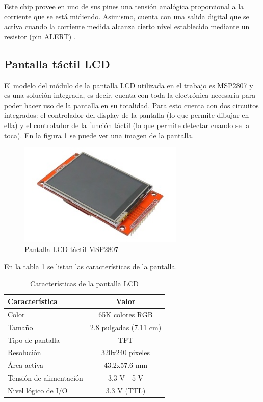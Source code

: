 Este chip provee en uno de sus pines una tensión analógica proporcional a la corriente que se está midiendo. Asimismo, cuenta con una salida digital que se activa cuando la corriente medida alcanza cierto nivel establecido mediante un resistor (pin ALERT) \citep{INA301}.

\subsection{Pantalla táctil LCD}

El modelo del módulo de la pantalla LCD utilizada en el trabajo es MSP2807 y es una solución integrada, es decir, cuenta con toda la electrónica necesaria para poder hacer uso de la pantalla en su totalidad. Para esto cuenta con dos circuitos integrados: el controlador del display de la pantalla (lo que permite dibujar en ella) y el controlador de la función táctil (lo que permite detectar cuando se la toca). En la figura \ref{fig:pantLCD} se puede ver una imagen de la pantalla.

\begin{figure}[H]
\centering
\includegraphics[width=0.7\textwidth]{./Figures/pant_LCD.png}
\caption{Pantalla LCD táctil MSP2807}
\label{fig:pantLCD}
\end{figure}

En la tabla \ref{tab:caractLCD} se listan las características de la pantalla.

\begin{table}[H]
	\centering
	\caption{Características de la pantalla LCD}
	\begin{tabular}{l c}
		\toprule
		\textbf{Característica}	& \textbf{Valor} \\
		\midrule
		Color				& 65K colores RGB \\
		Tamaño				& 2.8 pulgadas (7.11 cm) \\
		Tipo de pantalla	& TFT \\
		Resolución			& 320x240 pixeles \\
		Área activa			& 43.2x57.6 mm \\
		Tensión de alimentación		& 3.3 V - 5 V \\
		Nivel lógico de I/O			& 3.3 V (TTL) \\		
		\bottomrule
		\hline
	\end{tabular}
	\label{tab:caractLCD}
\end{table}


